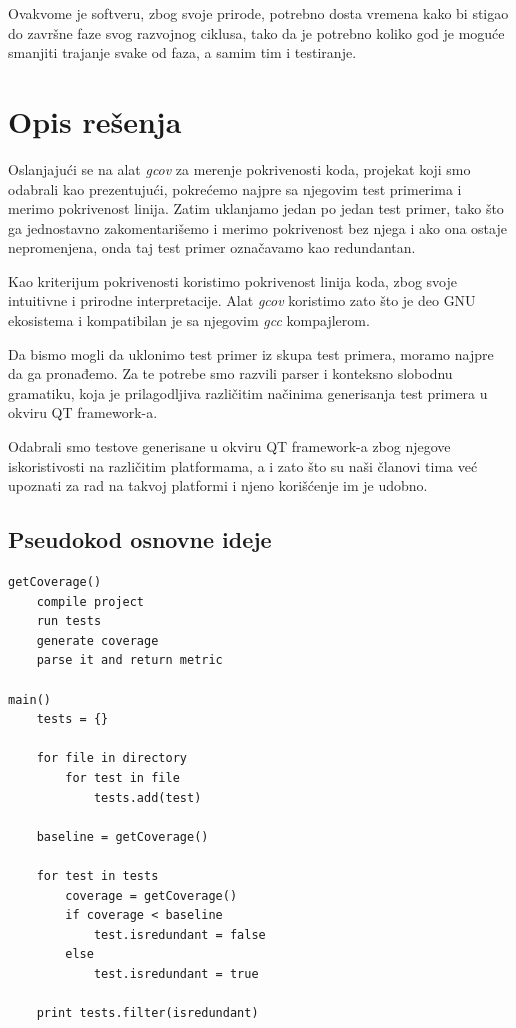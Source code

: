 \documentclass[a4paper]{article}
\begin{document}
Ovakvome je softveru, zbog svoje prirode, potrebno dosta vremena kako bi stigao do završne faze svog razvojnog ciklusa, tako da je potrebno koliko god je moguće smanjiti trajanje svake od faza, a samim tim i testiranje.

\section{Opis rešenja}
\label{sec:opis_resenja}

Oslanjajući se na alat \textit{gcov} za merenje pokrivenosti koda, projekat koji smo odabrali kao prezentujući, pokrećemo najpre sa njegovim test primerima i merimo pokrivenost linija. Zatim uklanjamo jedan po jedan test primer, tako što ga jednostavno zakomentarišemo i merimo pokrivenost bez njega i ako ona ostaje nepromenjena, onda taj test primer označavamo kao redundantan.

Kao kriterijum pokrivenosti koristimo pokrivenost linija koda, zbog svoje intuitivne i prirodne interpretacije. Alat \textit{gcov} koristimo zato što je deo GNU ekosistema i kompatibilan je sa njegovim \textit{gcc} kompajlerom.

Da bismo mogli da uklonimo test primer iz skupa test primera, moramo najpre da ga pronađemo. Za te potrebe smo razvili parser i konteksno slobodnu gramatiku, koja je prilagodljiva različitim načinima generisanja test primera u okviru QT framework-a.

Odabrali smo testove generisane u okviru QT framework-a zbog njegove iskoristivosti na različitim platformama, a i zato što su naši članovi tima već upoznati za rad na takvoj platformi i njeno korišćenje im je udobno.

\subsection{Pseudokod osnovne ideje}
\label{subsec:pseudokod}
\begin{lstlisting}
getCoverage()
    compile project
    run tests
    generate coverage
    parse it and return metric
    
main()
    tests = {}
    
    for file in directory
        for test in file
            tests.add(test)
            
    baseline = getCoverage()
    
    for test in tests
        coverage = getCoverage()
        if coverage < baseline
            test.isredundant = false
        else
            test.isredundant = true
            
    print tests.filter(isredundant)
\end{lstlisting}
\end{document}
